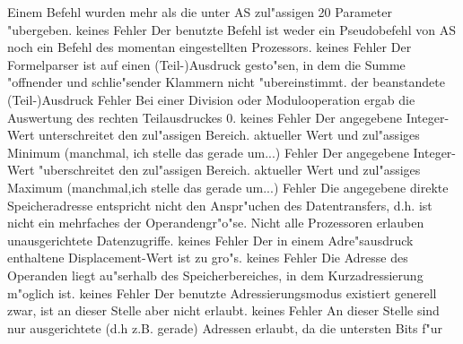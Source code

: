 \documentclass[12pt,a4paper,twoside]{report}
\begin{document}
{\begin{description}
               {Einem Befehl wurden mehr als die unter AS
                zul"assigen 20 Parameter "ubergeben.}
               {keines}
               {Fehler}
               {Der benutzte Befehl ist weder ein Pseudobefehl
                von AS noch ein Befehl des momentan eingestellten
                Prozessors.}
               {keines}
               {Fehler}
               {Der Formelparser ist auf einen (Teil-)Ausdruck
                gesto"sen, in dem die Summe "offnender und schlie"sender
                Klammern nicht "ubereinstimmt.}
               {der beanstandete (Teil-)Ausdruck}
               {Fehler}
               {Bei einer Division oder Modulooperation ergab
                die Auswertung des rechten Teilausdruckes 0.}
               {keines}
               {Fehler}
               {Der angegebene Integer-Wert unterschreitet
                den zul"assigen Bereich.}
               {aktueller Wert und zul"assiges Minimum
	        (manchmal, ich stelle das gerade um...)}
               {Fehler}
               {Der angegebene Integer-Wert "uberschreitet
                den zul"assigen Bereich.}
               {aktueller Wert und zul"assiges Maximum
	        (manchmal,ich stelle das gerade um...)}
               {Fehler}
               {Die angegebene direkte Speicheradresse
                entspricht nicht den Anspr"uchen des Datentransfers, d.h.
                ist nicht ein mehrfaches der Operandengr"o"se.  Nicht alle
                Prozessoren erlauben unausgerichtete Datenzugriffe.}
               {keines}
               {Fehler}
               {Der in einem Adre"sausdruck enthaltene
                Displacement-Wert ist zu gro"s.}
               {keines}
               {Fehler}
               {Die Adresse des Operanden liegt au"serhalb des
                Speicherbereiches, in dem Kurzadressierung m"oglich ist.}
               {keines}
               {Fehler}
               {Der benutzte Adressierungsmodus existiert
                generell zwar, ist an dieser Stelle aber nicht erlaubt.}
               {keines}
               {Fehler}
               {An dieser Stelle sind nur ausgerichtete
                (d.h z.B. gerade) Adressen erlaubt, da die untersten Bits f"ur
}
\end{description}}
\end{document}

